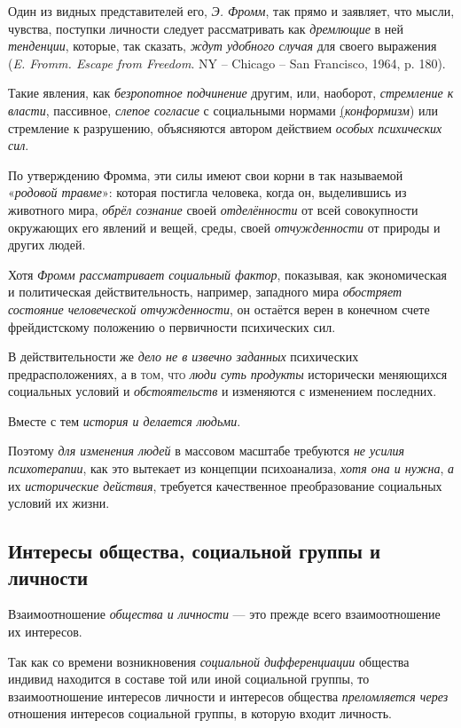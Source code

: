 \documentclass[a4paper,14pt,russian]{extreport}
\begin{document}
Один из видных представителей его, \emph{Э. Фромм}, так прямо и заявляет, что мысли, чувства, поступки личности следует рассматривать как \emph{дремлющие} в ней \emph{тенденции}, которые, так сказать, \emph{ждут удобного случая} для своего выражения (\emph{E. Fromm. Escape from Freedom}. NY -- Chicago -- San Francisco, 1964, p. 180).

Такие явления, как \emph{безропотное подчинение} другим, или, наоборот, \emph{стремление к власти}, пассивное, \emph{слепое согласие} с социальными нормами \underline{(}\emph{конформизм}) или стремление к разрушению, объясняются автором действием \emph{особых психических сил}.

По утверждению Фромма, эти силы имеют свои корни в так называемой «\emph{родовой травме}»: которая постигла человека, когда он, выделившись из животного мира, \emph{обрёл сознание} своей \emph{отделённости} от всей совокупности окружающих его явлений и вещей, среды, своей \emph{отчужденности} от природы и других людей.

Хотя \emph{Фромм рассматривает социальный фактор}, показывая, как экономическая и политическая действительность, например, западного мира \emph{обостряет состояние человеческой отчужденности}, он остаётся верен в конечном счете фрейдистскому положению о первичности психических сил.

В действительности же \emph{дело не в извечно заданных} психических предрасположениях, а в \textsc{том, что} \emph{люди суть продукты} исторически меняющихся социальных условий и \emph{обстоятельств} и изменяются с изменением последних.

Вместе с тем \emph{история и делается людьми}.

Поэтому \emph{для изменения людей} в массовом масштабе требуются \emph{не усилия психотерапии}, как это вытекает из концепции психоанализа, \emph{хотя она и нужна}, \emph{а} их \emph{исторические действия}, требуется качественное преобразование социальных условий их жизни.

\subsection{Интересы общества, социальной группы и личности}

Взаимоотношение \emph{общества и личности} --- это прежде всего взаимоотношение их интересов.

Так как со времени возникновения \emph{социальной дифференциации} общества индивид находится в составе той или иной социальной группы, то взаимоотношение интересов личности и интересов общества \emph{преломляется через} отношения интересов социальной группы, в которую входит личность.
\end{document}
